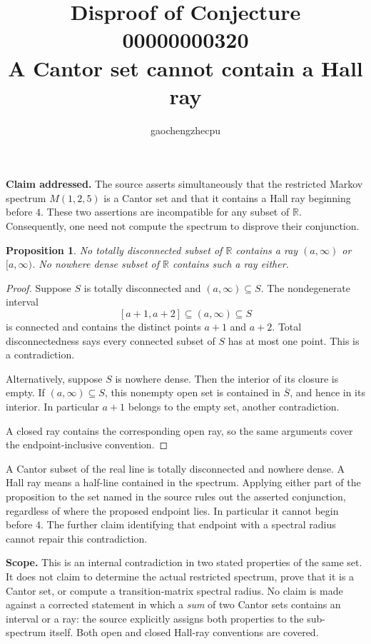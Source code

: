 \documentclass[11pt]{article}
\title{Disproof of Conjecture 00000000320\\A Cantor set cannot contain a Hall ray}
\author{gaochengzhecpu}\date{}
\newtheorem{proposition}{Proposition}
\begin{document}
\maketitle
\noindent\textbf{Claim addressed.} The source asserts simultaneously that the restricted Markov spectrum $M(1,2,5)$ is a Cantor set and that it contains a Hall ray beginning before $4$. These two assertions are incompatible for any subset of $\mathbb R$. Consequently, one need not compute the spectrum to disprove their conjunction.

\begin{proposition}
No totally disconnected subset of $\mathbb R$ contains a ray $(a,\infty)$ or $[a,\infty)$. No nowhere dense subset of $\mathbb R$ contains such a ray either.
\end{proposition}
\begin{proof}
Suppose $S$ is totally disconnected and $(a,\infty)\subseteq S$. The nondegenerate interval
\[
 [a+1,a+2]\subseteq(a,\infty)\subseteq S
\]
is connected and contains the distinct points $a+1$ and $a+2$. Total disconnectedness says every connected subset of $S$ has at most one point. This is a contradiction.

Alternatively, suppose $S$ is nowhere dense. Then the interior of its closure is empty. If $(a,\infty)\subseteq S$, this nonempty open set is contained in $\overline S$, and hence in its interior. In particular $a+1$ belongs to the empty set, another contradiction.

A closed ray contains the corresponding open ray, so the same arguments cover the endpoint-inclusive convention.
\end{proof}

A Cantor subset of the real line is totally disconnected and nowhere dense. A Hall ray means a half-line contained in the spectrum. Applying either part of the proposition to the set named in the source rules out the asserted conjunction, regardless of where the proposed endpoint lies. In particular it cannot begin before $4$. The further claim identifying that endpoint with a spectral radius cannot repair this contradiction.

\noindent\textbf{Scope.} This is an internal contradiction in two stated properties of the same set. It does not claim to determine the actual restricted spectrum, prove that it is a Cantor set, or compute a transition-matrix spectral radius. No claim is made against a corrected statement in which a \emph{sum} of two Cantor sets contains an interval or a ray: the source explicitly assigns both properties to the sub-spectrum itself. Both open and closed Hall-ray conventions are covered.
\end{document}
